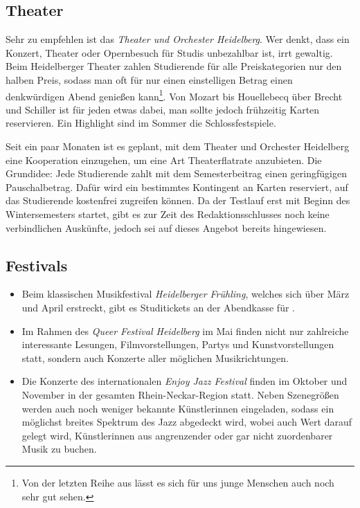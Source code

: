 \subsection{Theater}
Sehr zu empfehlen ist das \emph{Theater und Orchester Heidelberg}. Wer denkt, dass ein Konzert, Theater oder Opernbesuch für Studis unbezahlbar ist, irrt gewaltig. Beim Heidelberger Theater zahlen Studierende für alle Preiskategorien nur den halben Preis, sodass man oft für nur einen einstelligen Betrag einen denkwürdigen Abend genießen kann\footnote{Von der letzten Reihe aus lässt es sich für uns junge Menschen auch noch sehr gut sehen.}. Von Mozart bis Houellebecq über Brecht und Schiller ist für jeden etwas dabei, man sollte jedoch frühzeitig Karten reservieren. Ein Highlight sind im Sommer die Schlossfestspiele.

Seit ein paar Monaten ist es geplant, mit dem Theater und Orchester Heidelberg eine Kooperation einzugehen, um eine Art Theaterflatrate anzubieten. Die Grundidee: Jede Studierende zahlt mit dem Semesterbeitrag einen geringfügigen Pauschalbetrag. Dafür wird ein bestimmtes Kontingent an Karten reserviert, auf das Studierende kostenfrei zugreifen können. 
Da der Testlauf erst mit Beginn des Wintersemesters startet, gibt es zur Zeit des Redaktionsschlusses noch keine verbindlichen Auskünfte, jedoch sei auf dieses Angebot bereits hingewiesen.

\subsection{Festivals}

\begin{itemize}
\item Beim klassischen Musikfestival \emph{Heidelberger Frühling}, welches sich über März und April erstreckt, gibt es Studitickets an der Abendkasse für .
\item Im Rahmen des \emph{Queer Festival Heidelberg} im Mai finden nicht nur zahlreiche interessante Lesungen, Filmvorstellungen, Partys und Kunstvorstellungen statt, sondern auch Konzerte aller möglichen Musikrichtungen.
\item Die Konzerte des internationalen \emph{Enjoy Jazz Festival} finden im Oktober und November in der gesamten Rhein-Neckar-Region statt. Neben Szenegrößen werden auch noch weniger bekannte Künstlerinnen eingeladen, sodass ein möglichst breites Spektrum des Jazz abgedeckt wird, wobei auch Wert darauf gelegt wird, Künstlerinnen aus angrenzender oder gar nicht zuordenbarer Musik zu buchen.
\end{itemize}
